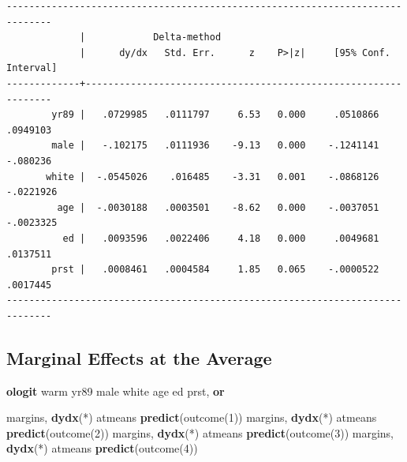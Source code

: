 \documentclass[
]{book}
\newenvironment{Shaded}{\begin{snugshade}}{\end{snugshade}}
\newcommand{\BaseNTok}[1]{\textcolor[rgb]{0.00,0.00,0.81}{#1}}
\newcommand{\KeywordTok}[1]{\textcolor[rgb]{0.13,0.29,0.53}{\textbf{#1}}}
\newcommand{\NormalTok}[1]{#1}
\begin{document}
\begin{verbatim}
------------------------------------------------------------------------------
             |            Delta-method
             |      dy/dx   Std. Err.      z    P>|z|     [95% Conf. Interval]
-------------+----------------------------------------------------------------
        yr89 |   .0729985   .0111797     6.53   0.000     .0510866    .0949103
        male |   -.102175   .0111936    -9.13   0.000    -.1241141    -.080236
       white |  -.0545026    .016485    -3.31   0.001    -.0868126   -.0221926
         age |  -.0030188   .0003501    -8.62   0.000    -.0037051   -.0023325
          ed |   .0093596   .0022406     4.18   0.000     .0049681    .0137511
        prst |   .0008461   .0004584     1.85   0.065    -.0000522    .0017445
------------------------------------------------------------------------------
\end{verbatim}

\subsection{Marginal Effects at the Average}\label{marginal-effects-at-the-average-1}

\begin{Shaded}
\begin{Highlighting}[]
\KeywordTok{ologit}\NormalTok{ warm yr89 male }\BaseNTok{white}\NormalTok{ age ed prst, }\KeywordTok{or}

\NormalTok{margins, }\KeywordTok{dydx}\NormalTok{(*) atmeans }\KeywordTok{predict}\NormalTok{(outcome(1))}
\NormalTok{margins, }\KeywordTok{dydx}\NormalTok{(*) atmeans }\KeywordTok{predict}\NormalTok{(outcome(2))}
\NormalTok{margins, }\KeywordTok{dydx}\NormalTok{(*) atmeans }\KeywordTok{predict}\NormalTok{(outcome(3))}
\NormalTok{margins, }\KeywordTok{dydx}\NormalTok{(*) atmeans }\KeywordTok{predict}\NormalTok{(outcome(4))}
\end{Highlighting}
\end{Shaded}
\end{document}
